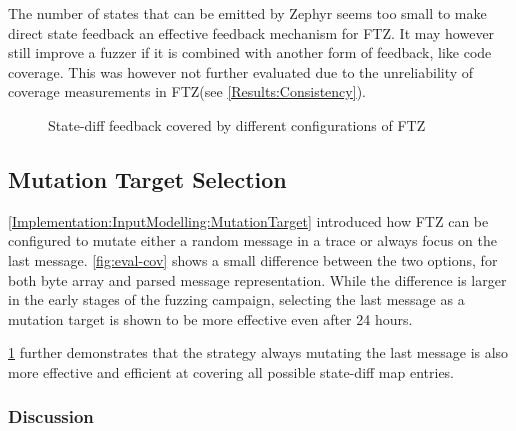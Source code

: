 \documentclass[twocolumn]{article}
\newcommand{\proj}{FTZ\xspace}
\begin{document}
The number of states that can be emitted by Zephyr seems too small to make direct state feedback an effective feedback mechanism for \proj. It may however still improve a fuzzer if it is combined with another form of feedback, like code coverage. This was however not further evaluated due to the unreliability of coverage measurements in \proj (see \cref{Results:Consistency}).

\begin{figure}
  \caption{State-diff feedback covered by different configurations of \proj}
  \label{fig:eval-state-diff-map}
\end{figure}

\subsection{Mutation Target Selection}

\cref{Implementation:InputModelling:MutationTarget} introduced how \proj can be configured to mutate either a random message in a trace or always focus on the last message. \cref{fig:eval-cov} shows a small difference between the two options, for both byte array and parsed message representation. While the difference is larger in the early stages of the fuzzing campaign, selecting the last message as a mutation target is shown to be more effective even after 24 hours.

\cref{fig:eval-state-diff-map} further demonstrates that the strategy always mutating the last message is also more effective and efficient at covering all possible state-diff map entries.

\subsubsection*{Discussion}
\end{document}
